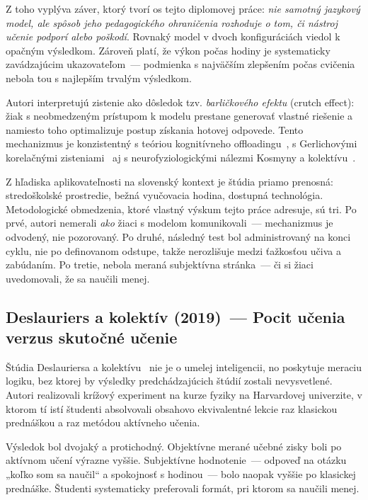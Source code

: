 Z toho vyplýva záver, ktorý tvorí os tejto diplomovej práce: \emph{nie samotný jazykový model, ale spôsob jeho pedagogického ohraničenia rozhoduje o tom, či nástroj učenie podporí alebo poškodí}. Rovnaký model v dvoch konfiguráciách viedol k opačným výsledkom. Zároveň platí, že výkon počas hodiny je systematicky zavádzajúcim ukazovateľom~--- podmienka s najväčším zlepšením počas cvičenia nebola tou s najlepším trvalým výsledkom.

Autori interpretujú zistenie ako dôsledok tzv. \emph{barličkového efektu} (crutch effect): žiak s neobmedzeným prístupom k modelu prestane generovať vlastné riešenie a namiesto toho optimalizuje postup získania hotovej odpovede. Tento mechanizmus je konzistentný s teóriou kognitívneho offloadingu~\cite{risko2016offloading}, s Gerlichovými korelačnými zisteniami~\cite{gerlich2025offloading} aj s neurofyziologickými nálezmi Kosmyny a kolektívu~\cite{kosmyna2025brain}.

Z hľadiska aplikovateľnosti na slovenský kontext je štúdia priamo prenosná: stredoškolské prostredie, bežná vyučovacia hodina, dostupná technológia. Metodologické obmedzenia, ktoré vlastný výskum tejto práce adresuje, sú tri. Po prvé, autori nemerali \emph{ako} žiaci s modelom komunikovali~--- mechanizmus je odvodený, nie pozorovaný. Po druhé, následný test bol administrovaný na konci cyklu, nie po definovanom odstupe, takže nerozlišuje medzi ťažkosťou učiva a zabúdaním. Po tretie, nebola meraná subjektívna stránka~--- či si žiaci uvedomovali, že sa naučili menej.


\subsection{Deslauriers a kolektív (2019)~--- Pocit učenia verzus skutočné učenie}
\label{subsec:deslauriers}

Štúdia Deslauriersa a kolektívu~\cite{deslauriers2019feeling} nie je o umelej inteligencii, no poskytuje meraciu logiku, bez ktorej by výsledky predchádzajúcich štúdií zostali nevysvetlené. Autori realizovali krížový experiment na kurze fyziky na Harvardovej univerzite, v ktorom tí istí študenti absolvovali obsahovo ekvivalentné lekcie raz klasickou prednáškou a raz metódou aktívneho učenia.

Výsledok bol dvojaký a protichodný. Objektívne merané učebné zisky boli po aktívnom učení výrazne vyššie. Subjektívne hodnotenie~--- odpoveď na otázku „koľko som sa naučil“ a spokojnosť s hodinou~--- bolo naopak vyššie po klasickej prednáške. Študenti systematicky preferovali formát, pri ktorom sa naučili menej.

